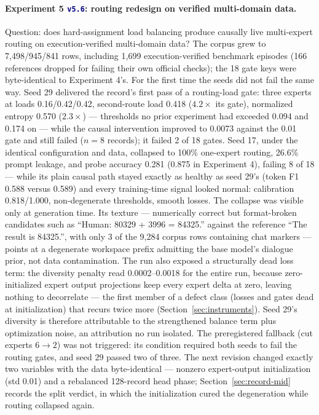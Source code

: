 \documentclass[10pt,a4paper]{article}
\newcommand{\studytag}[1]{\colorbox{navy!10}{\textcolor{navy}{\footnotesize\texttt{#1}}}}
\begin{document}
\paragraph{Experiment 5 \studytag{v5.6}: routing redesign on verified multi-domain data.}
Question: does hard-assignment load balancing produce causally live multi-expert routing on execution-verified multi-domain data? The corpus grew to 7,498/945/841 rows, including 1,699 execution-verified benchmark episodes (166 references dropped for failing their own official checks); the 18 gate keys were byte-identical to Experiment 4's. For the first time the seeds did not fail the same way. Seed 29 delivered the record's first pass of a routing-load gate: three experts at loads 0.16/0.42/0.42, second-route load 0.418 ($4.2\times$ its gate), normalized entropy 0.570 ($2.3\times$) --- thresholds no prior experiment had exceeded 0.094 and 0.174 on --- while the causal intervention improved to 0.0073 against the 0.01 gate and still failed ($n=8$ records); it failed 2 of 18 gates. Seed 17, under the identical configuration and data, collapsed to 100\% one-expert routing, 26.6\% prompt leakage, and probe accuracy 0.281 (0.875 in Experiment 4), failing 8 of 18 --- while its plain causal path stayed exactly as healthy as seed 29's (token F1 0.588 versus 0.589) and every training-time signal looked normal: calibration 0.818/1.000, non-degenerate thresholds, smooth losses. The collapse was visible only at generation time. Its texture --- numerically correct but format-broken candidates such as ``Human: 80329 + 3996 = 84325.'' against the reference ``The result is 84325.'', with only 3 of the 9,284 corpus rows containing chat markers --- points at a degenerate workspace prefix admitting the base model's dialogue prior, not data contamination. The run also exposed a structurally dead loss term: the diversity penalty read 0.0002--0.0018 for the entire run, because zero-initialized expert output projections keep every expert delta at zero, leaving nothing to decorrelate --- the first member of a defect class (losses and gates dead at initialization) that recurs twice more (Section~\ref{sec:instruments}). Seed 29's diversity is therefore attributable to the strengthened balance term plus optimization noise, an attribution no run isolated. The preregistered fallback (cut experts $6 \rightarrow 2$) was not triggered: its condition required both seeds to fail the routing gates, and seed 29 passed two of three. The next revision changed exactly two variables with the data byte-identical --- nonzero expert-output initialization (std 0.01) and a rebalanced 128-record head phase; Section~\ref{sec:record-mid} records the split verdict, in which the initialization cured the degeneration while routing collapsed again.
\end{document}
